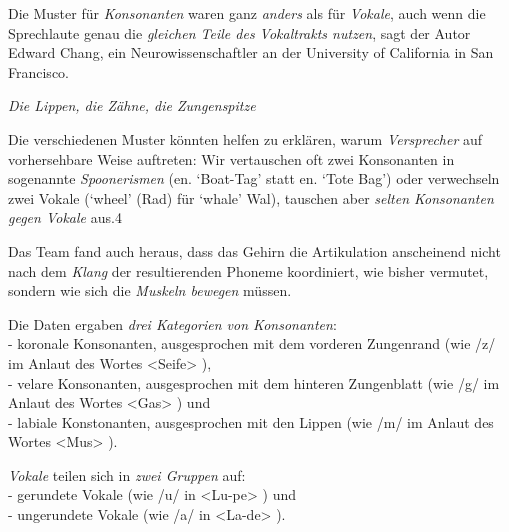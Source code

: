 \documentclass[
  letterpaper,
]{scrbook}
\begin{document}
Die Muster für \emph{Konsonanten} waren ganz \emph{anders} als für
\emph{Vokale}, auch wenn die Sprechlaute genau die \emph{gleichen Teile
des Vokaltrakts nutzen}, sagt der Autor Edward Chang, ein
Neurowissenschaftler an der University of California in San Francisco.

\emph{Die Lippen, die Zähne, die Zungenspitze}

Die verschiedenen Muster könnten helfen zu erklären, warum
\emph{Versprecher} auf vorhersehbare Weise auftreten: Wir vertauschen
oft zwei Konsonanten in sogenannte \emph{Spoonerismen} (en. `Boat-Tag'
statt en. `Tote Bag') oder verwechseln zwei Vokale (`wheel' (Rad) für
`whale' Wal), tauschen aber \emph{selten Konsonanten gegen Vokale} aus.4

Das Team fand auch heraus, dass das Gehirn die Artikulation anscheinend
nicht nach dem \emph{Klang} der resultierenden Phoneme koordiniert, wie
bisher vermutet, sondern wie sich die \emph{Muskeln bewegen} müssen.

\begin{tcolorbox}[enhanced jigsaw, coltitle=black, colback=white, breakable, toprule=.15mm, bottomrule=.15mm, title=\textcolor{quarto-callout-important-color}{\faExclamation}\hspace{0.5em}{Phonemkategorien (nach Muskelbewegungen)}, rightrule=.15mm, opacitybacktitle=0.6, toptitle=1mm, titlerule=0mm, left=2mm, colbacktitle=quarto-callout-important-color!10!white, bottomtitle=1mm, colframe=quarto-callout-important-color-frame, arc=.35mm, leftrule=.75mm, opacityback=0]

Die Daten ergaben \emph{drei Kategorien von Konsonanten}:\\
- koronale Konsonanten, ausgesprochen mit dem vorderen Zungenrand (wie
/z/ im Anlaut des Wortes \textless Seife\textgreater{} ),\\
- velare Konsonanten, ausgesprochen mit dem hinteren Zungenblatt (wie
/g/ im Anlaut des Wortes \textless Gas\textgreater{} ) und\\
- labiale Konstonanten, ausgesprochen mit den Lippen (wie /m/ im Anlaut
des Wortes \textless Mus\textgreater{} ).

\emph{Vokale} teilen sich in \emph{zwei Gruppen} auf:\\
- gerundete Vokale (wie /u/ in \textless Lu-pe\textgreater{} ) und\\
- ungerundete Vokale (wie /a/ in \textless La-de\textgreater{} ).

\end{tcolorbox}
\end{document}
